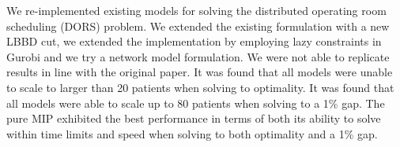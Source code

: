 We re-implemented existing models\cite{roshanaei2017propagating} for solving the distributed operating room scheduling (DORS) problem. We extended the existing formulation with a new LBBD cut, we extended the implementation by employing lazy constraints in Gurobi and we try a network model formulation. We were not able to replicate results in line with the original paper. It was found that all models were unable to scale to larger than 20 patients when solving to optimality. It was found that all models were able to scale up to 80 patients when solving to a 1\% gap. The pure MIP exhibited the best performance in terms of both its ability to solve within time limits and speed when solving to both optimality and a 1\% gap. 

